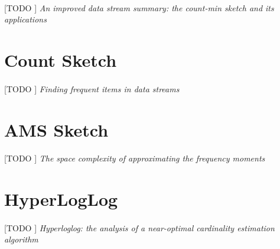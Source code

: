 \documentclass{subfiles}
\begin{document}
      \paragraph{}
      [TODO ] \emph{An improved data stream summary: the count-min sketch and its applications} \cite{cormode2005improved}

    \section{Count Sketch}
    \label{sec:count_sketch}

      \paragraph{}
      [TODO ] \emph{Finding frequent items in data streams} \cite{charikar2002finding}

    \section{AMS Sketch}
    \label{sec:ams_sketch}

      \paragraph{}
      [TODO ] \emph{The space complexity of approximating the frequency moments} \cite{alon1996space}

    \section{HyperLogLog}
    \label{sec:hyper_log_log}

      \paragraph{}
      [TODO ] \emph{Hyperloglog: the analysis of a near-optimal cardinality estimation algorithm} \cite{flajolet2007hyperloglog}
\end{document}
